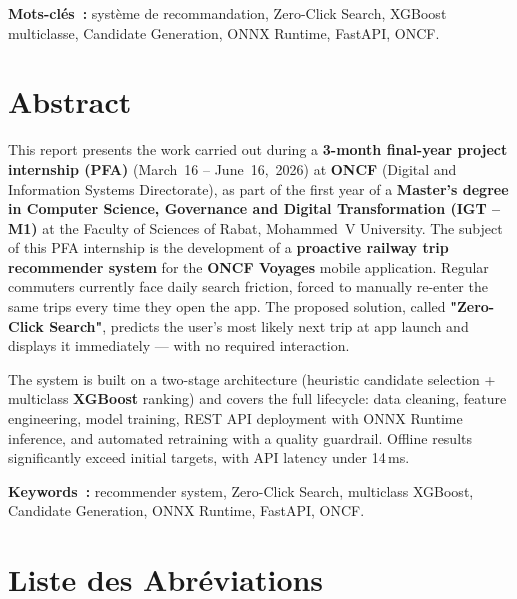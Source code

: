 \documentclass[12pt, a4paper]{report}
\begin{document}
\bigskip
\noindent\textbf{Mots-clés~:} système de recommandation, Zero-Click Search,
XGBoost multiclasse, Candidate Generation, ONNX Runtime, FastAPI, ONCF.

\newpage
\chapter*{Abstract}

This report presents the work carried out during a \textbf{3-month final-year
project internship (PFA)} (March~16 -- June~16,~2026) at \textbf{ONCF}
(Digital and Information Systems Directorate), as part of the first year of a
\textbf{Master's degree in Computer Science, Governance and Digital
Transformation (IGT -- M1)} at the Faculty of Sciences of Rabat,
Mohammed~V University. The subject of this PFA internship is the development
of a \textbf{proactive railway trip recommender system}
for the \textbf{ONCF Voyages} mobile application. Regular commuters currently
face daily search friction, forced to manually re-enter the same trips every
time they open the app. The proposed solution, called
\textbf{"Zero-Click Search"}, predicts the user's most likely next trip at
app launch and displays it immediately --- with no required interaction.

The system is built on a two-stage architecture (heuristic candidate selection
+ multiclass \textbf{XGBoost} ranking) and covers the full lifecycle: data
cleaning, feature engineering, model training, REST API deployment with ONNX
Runtime inference, and automated retraining with a quality guardrail. Offline
results significantly exceed initial targets, with API latency under 14\,ms.

\bigskip
\noindent\textbf{Keywords~:} recommender system, Zero-Click Search, multiclass
XGBoost, Candidate Generation, ONNX Runtime, FastAPI, ONCF.

\begingroup
\hypersetup{linkcolor=black, citecolor=black}
\newpage
\tableofcontents

\newpage
\listoffigures
{}

\newpage
\listoftables
{}
\endgroup

\newpage
\chapter*{Liste des Abréviations}
\end{document}
